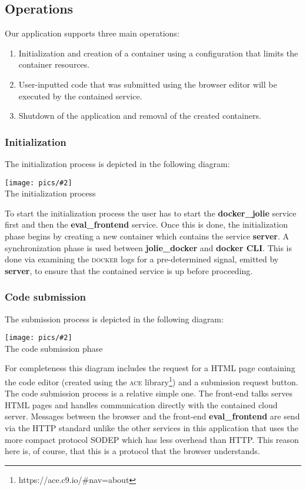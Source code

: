 \documentclass[12pt]{article}
\newcommand{\img}[3] {
	\begin{center}
	\texttt{[image: pics/\#2]}\\
	{\small #3}
	\end{center}
}
\newcommand{\docker}[0] {\textsc{docker}}
\newcommand{\ace} {\textsc{ace}}
\begin{document}
\subsection{Operations}
Our application supports three main operations:
\begin{enumerate}
\item Initialization and creation of a container using a configuration that limits the container resources.
\item User-inputted code that was submitted using the browser editor will be executed by the contained service.
\item Shutdown of the application and removal of the created containers.
\end{enumerate}

\subsubsection{Initialization}
The initialization process is depicted in the following diagram:
\img{0.7}{init}{The initialization process}
To start the initialization process the user has to start the \textbf{docker\_jolie} service first and then the \textbf{eval\_frontend} service. Once this is done, the initialization phase begins by creating a new container which contains the service \textbf{server}. A synchronization phase is used between \textbf{jolie\_docker} and \textbf{docker CLI}. This is done via examining the \docker{} logs for a pre-determined signal, emitted by \textbf{server}, to ensure that the contained service is up before proceeding.

\subsubsection{Code submission}
\noindent{}The submission process is depicted in the following diagram:
\img{0.7}{submit}{The code submission phase}
For completeness this diagram includes the request for a HTML page containing the code editor (created using the \ace{} library\footnote{https://ace.c9.io/\#nav=about}) and a submission request button.\\  

The code submission process is a relative simple one. The front-end talks serves HTML pages and handles communication directly with the contained cloud server. Messages between the browser and the front-end \textbf{eval\_frontend} are send via the HTTP standard unlike the other services in this application that uses the more compact protocol SODEP which has less overhead than HTTP. This reason here is, of course, that this is a protocol that the browser understands.
\end{document}
